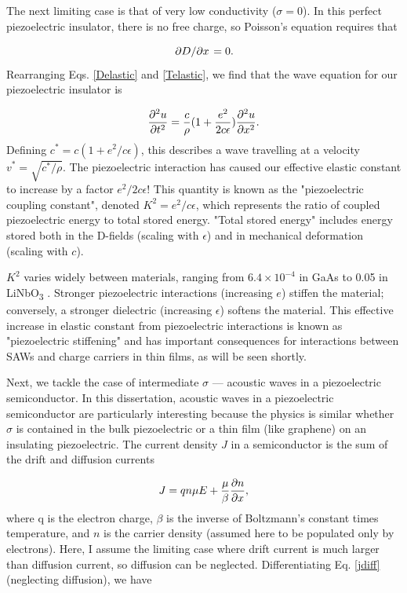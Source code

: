 \documentclass[double,12pt,1in]{beavtex}
\begin{document}
The next limiting case is that of very low conductivity ($\sigma = 0$). In this perfect piezoelectric insulator, there is no free charge, so Poisson's equation requires that 

\begin{equation}
    \pdv*{D}{x} = 0.
\end{equation}
Rearranging Eqs. \ref{Delastic} and \ref{Telastic}, we find that the wave equation for our piezoelectric insulator is

\begin{equation}
    \pdv[2]{u}{t} = \frac{c}{\rho} (1 + \frac{e^2}{2c\epsilon}) \pdv[2]{u}{x}. \label{wave eqn for insulator}
\end{equation}
Defining $c^* = c(1 + e^2/c\epsilon)$, this describes a wave travelling at a velocity $v^* =\sqrt{c^*/\rho}$. The piezoelectric interaction has caused our effective elastic constant to increase by a factor $e^2/2c\epsilon$! This quantity is known as the "piezoelectric coupling constant", denoted $K^2 = e^2/c\epsilon$, which represents the ratio of coupled piezoelectric energy to total stored energy. "Total stored energy" includes energy stored both in the D-fields (scaling with $\epsilon$) and in mechanical deformation (scaling with $c$). 

$K^2$ varies widely between materials, ranging from $6.4 \times 10^{-4}$ in GaAs \cite{wixforth_surface_1989} to 0.05 in LiNbO\textsubscript{3} \cite{warner_determination_1967}. Stronger piezoelectric interactions (increasing $e$) stiffen the material; conversely, a stronger dielectric (increasing $\epsilon$) softens the material. This effective increase in elastic constant from piezoelectric interactions is known as "piezoelectric stiffening" and has important consequences for interactions between SAWs and charge carriers in thin films, as will be seen shortly. 

Next, we tackle the case of intermediate $\sigma$ — acoustic waves in a piezoelectric semiconductor. In this dissertation, acoustic waves in a piezoelectric semiconductor are particularly interesting because the physics is similar whether $\sigma$ is contained in the bulk piezoelectric or a thin film (like graphene) on an insulating piezoelectric. The current density $J$ in a semiconductor is the sum of the drift and diffusion currents

\begin{equation}
    J = q n \mu E + \frac{\mu}{\beta} \pdv{n}{x}, \label{jdiff}
\end{equation}
where q is the electron charge, $\beta$ is the inverse of Boltzmann's constant times temperature, and $n$ is the carrier density (assumed here to be populated only by electrons). Here, I assume the limiting case where drift current is much larger than diffusion current, so diffusion can be neglected. Differentiating Eq. \ref{jdiff} (neglecting diffusion), we have
\end{document}

